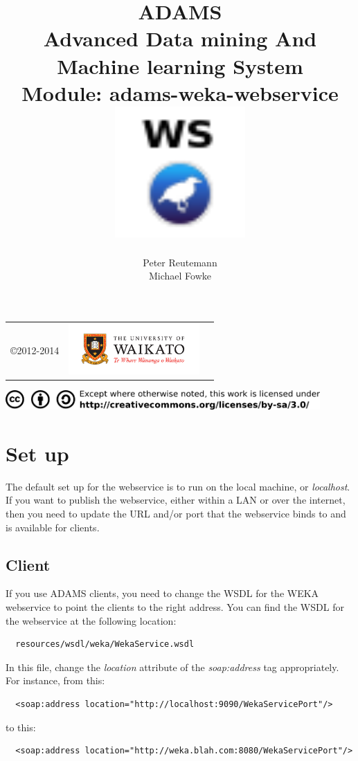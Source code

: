 \documentclass[a4paper]{book}
\title{
  \textbf{ADAMS} \\
  {\Large \textbf{A}dvanced \textbf{D}ata mining \textbf{A}nd \textbf{M}achine
  learning \textbf{S}ystem} \\
  {\Large Module: adams-weka-webservice} \\
  \vspace{1cm}
  \includegraphics[width=5cm]{images/weka-webservice-module.png} \\
}
\author{
  Peter Reutemann \\
  Michael Fowke
}
\begin{document}
\begin{titlepage}
\maketitle

\thispagestyle{empty}
\center
\begin{table}[b]
	\begin{tabular}{c l l}
		\parbox[c][2cm]{2cm}{\copyright 2012-2014} &
		\parbox[c][2cm]{5cm}{\includegraphics[width=5cm]{images/coat_of_arms.pdf}}
	\end{tabular}
	\includegraphics[width=12cm]{images/cc.png} \\
\end{table}

\end{titlepage}

\tableofcontents
\listoffigures

\chapter{Set up}
The default set up for the webservice is to run on the local machine, or
\textit{localhost}. If you want to publish the webservice, either within
a LAN or over the internet, then you need to update the URL and/or port that the 
webservice binds to and is available for clients.

\section{Client}
If you use ADAMS clients, you need to change the WSDL for the WEKA webservice
to point the clients to the right address. You can find the WSDL for the 
webservice at the following location:
\begin{verbatim}
  resources/wsdl/weka/WekaService.wsdl
\end{verbatim}
In this file, change the \textit{location} attribute of the \textit{soap:address} 
tag appropriately. For instance, from this:\
\begin{verbatim}
  <soap:address location="http://localhost:9090/WekaServicePort"/>
\end{verbatim}
to this:
\begin{verbatim}
  <soap:address location="http://weka.blah.com:8080/WekaServicePort"/>
\end{verbatim}
\end{document}
